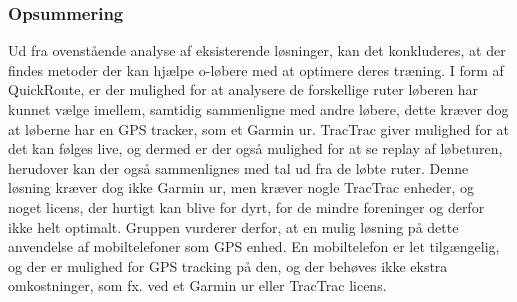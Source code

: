 \subsubsection{Opsummering}
Ud fra ovenstående analyse af eksisterende løsninger, kan det konkluderes, at der findes metoder der kan hjælpe o-løbere med at optimere deres træning. I form af QuickRoute, er der mulighed for at analysere de forskellige ruter løberen har kunnet vælge imellem, samtidig sammenligne med andre løbere, dette kræver dog at løberne har en GPS tracker, som et Garmin ur. TracTrac giver mulighed for at det kan følges live, og dermed er der også mulighed for at se replay af løbeturen, herudover kan der også sammenlignes med tal ud fra de løbte ruter. Denne løsning kræver dog ikke Garmin ur, men kræver nogle TracTrac enheder, og noget licens, der hurtigt kan blive for dyrt, for de mindre foreninger og derfor ikke helt optimalt. 
Gruppen vurderer derfor, at en mulig løsning på dette anvendelse af mobiltelefoner som GPS enhed. En mobiltelefon er let tilgængelig, og der er mulighed for GPS tracking på den, og der behøves ikke ekstra omkostninger, som fx. ved et Garmin ur eller TracTrac licens.

